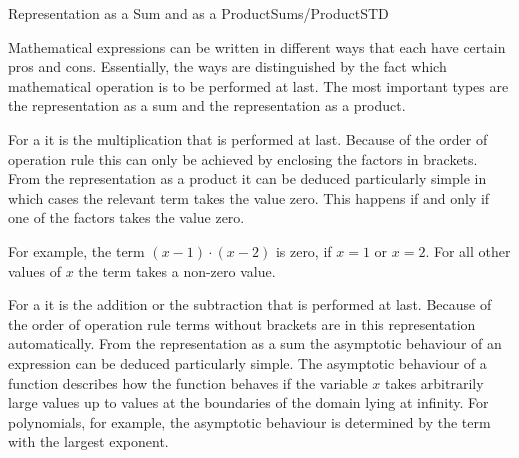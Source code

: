 \begin{MXContent}{Representation as a Sum and as a Product}{Sums/Product}{STD}

% 


Mathematical expressions can be written in different ways that each have certain pros and cons. Essentially,
the ways are distinguished by the fact which mathematical operation is to be performed at last. The most important types
are the representation as a sum and the representation as a product.


\begin{MInfo}
For a  it is the multiplication that is performed at last. Because 
of the order of operation rule this can only be achieved by enclosing the factors in brackets. From the representation as a 
product it can be deduced particularly simple in which cases the relevant term takes the value zero. This happens if and only if
one of the factors takes the value zero.
\end{MInfo}

For example, the term $(x-1)\cdot (x-2)$ is zero, if $x=1$ or $x=2$. For all other values of $x$ the term takes a non-zero value.

\begin{MInfo}
For a  it is the addition or the subtraction that is performed at last. 
Because of the order of operation rule terms without brackets are in this representation automatically. From the representation
as a sum the asymptotic behaviour of an expression can be deduced particularly simple. The asymptotic behaviour of a function 
describes how the function behaves if the variable $x$ takes arbitrarily large values up to values at the boundaries of the domain 
lying at infinity. For polynomials, for example, the asymptotic behaviour is determined by the term with the largest exponent.
\end{MInfo}


\end{MXContent}
